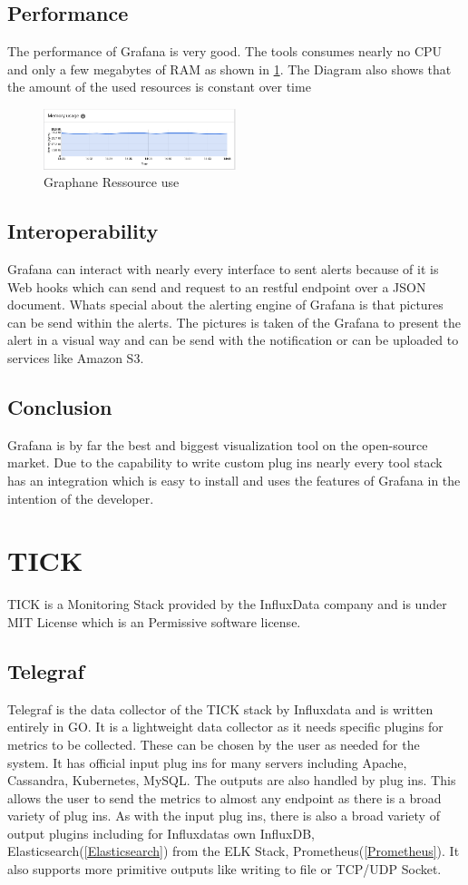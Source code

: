 \subsection{Performance}
The performance of Grafana is very good. The tools consumes nearly no CPU and only a few megabytes of RAM as shown in \cref{fig:Grafan_RAM}. The Diagram also shows that the amount of the used resources is constant over time
\begin{figure}
\centering
\includegraphics[width=0.5\textwidth]{Bilder/Performance/Grafan_RAM}
\caption{Graphane Ressource use}
\label{fig:Grafan_RAM}
\end{figure}
\subsection{Interoperability}
Grafana can interact with nearly every interface to sent alerts because of it is Web hooks which can send and request to an restful endpoint over a JSON document. Whats special about the alerting engine of Grafana is that pictures can be send within the alerts. The pictures is taken of the Grafana to present the alert in a visual way and can be send with the notification or can be uploaded to services like Amazon S3.

\subsection{Conclusion}
Grafana is by far the best and biggest visualization tool on the open-source market. Due to the capability to write custom plug ins nearly every tool stack has an integration which is easy to install and uses the features of Grafana in the intention of the developer.

\section{TICK}
\label{tick}
TICK is a Monitoring Stack provided by the InfluxData company and is under MIT License which is an Permissive software license.
\subsection{Telegraf}
Telegraf is the data collector of the TICK stack by Influxdata and is written entirely in GO. It is a lightweight data collector as it needs specific plugins for metrics to be collected. These can be chosen by the user as needed for the system. It has official input plug ins for many servers including Apache, Cassandra, Kubernetes, MySQL.
The outputs are also handled by plug ins. This allows the user to send the metrics to almost any endpoint as there is a broad variety of plug ins. As with the input plug ins, there is also a broad variety of output plugins including for Influxdatas own InfluxDB, Elasticsearch(\ref{Elasticsearch}) from the ELK Stack, Prometheus(\ref{Prometheus}). It also supports more primitive outputs like writing to file or TCP/UDP Socket.
